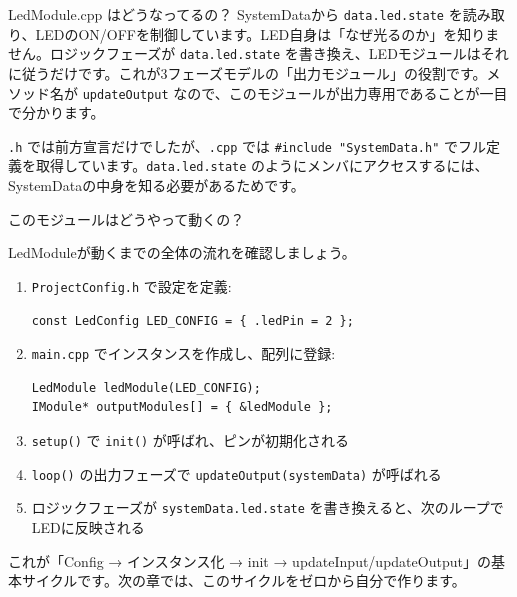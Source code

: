 \begin{qabox}{LedModule.cpp はどうなってるの？}
SystemDataから \texttt{data.led.state} を読み取り、LEDのON/OFFを制御しています。LED自身は「なぜ光るのか」を知りません。ロジックフェーズが \texttt{data.led.state} を書き換え、LEDモジュールはそれに従うだけです。これが3フェーズモデルの「出力モジュール」の役割です。メソッド名が \texttt{updateOutput} なので、このモジュールが出力専用であることが一目で分かります。

\begin{notebox}
\texttt{.h} では前方宣言だけでしたが、\texttt{.cpp} では \texttt{\#include "SystemData.h"} でフル定義を取得しています。\texttt{data.led.state} のようにメンバにアクセスするには、SystemDataの中身を知る必要があるためです。
\end{notebox}

\end{qabox}

\begin{qabox}{このモジュールはどうやって動くの？}

LedModuleが動くまでの全体の流れを確認しましょう。

\begin{enumerate}
  \item \texttt{ProjectConfig.h} で設定を定義:
\begin{lstlisting}
const LedConfig LED_CONFIG = { .ledPin = 2 };
\end{lstlisting}

  \item \texttt{main.cpp} でインスタンスを作成し、配列に登録:
\begin{lstlisting}
LedModule ledModule(LED_CONFIG);
IModule* outputModules[] = { &ledModule };
\end{lstlisting}

  \item \texttt{setup()} で \texttt{init()} が呼ばれ、ピンが初期化される
  \item \texttt{loop()} の出力フェーズで \texttt{updateOutput(systemData)} が呼ばれる
  \item ロジックフェーズが \texttt{systemData.led.state} を書き換えると、次のループでLEDに反映される
\end{enumerate}

これが「Config → インスタンス化 → init → updateInput/updateOutput」の基本サイクルです。次の章では、このサイクルをゼロから自分で作ります。

\end{qabox}
